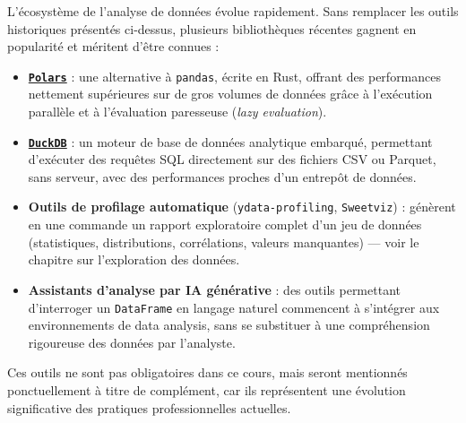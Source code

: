 \documentclass[
  french,
  letterpaper,
  open=any]{scrbook}
\providecommand{\tightlist}{%
  \setlength{\itemsep}{0pt}\setlength{\parskip}{0pt}}
\theoremstyle{definition}
\theoremstyle{definition}
\theoremstyle{remark}
\begin{document}
\begin{tcolorbox}[enhanced jigsaw, arc=.35mm, bottomrule=.15mm, bottomtitle=1mm, breakable, colback=white, colbacktitle=quarto-callout-important-color!10!white, colframe=quarto-callout-important-color-frame, coltitle=black, left=2mm, leftrule=.75mm, opacityback=0, opacitybacktitle=0.6, rightrule=.15mm, title=\textcolor{quarto-callout-important-color}{\faExclamation}\hspace{0.5em}{Zoom sur les tendances actuelles}, titlerule=0mm, toprule=.15mm, toptitle=1mm]

L'écosystème de l'analyse de données évolue rapidement. Sans remplacer
les outils historiques présentés ci-dessus, plusieurs bibliothèques
récentes gagnent en popularité et méritent d'être connues :

\begin{itemize}
\tightlist
\item
  \textbf{\href{https://pola.rs}{\texttt{Polars}}} : une alternative à
  \texttt{pandas}, écrite en Rust, offrant des performances nettement
  supérieures sur de gros volumes de données grâce à l'exécution
  parallèle et à l'évaluation paresseuse (\emph{lazy evaluation}).
\item
  \textbf{\href{https://duckdb.org}{\texttt{DuckDB}}} : un moteur de
  base de données analytique embarqué, permettant d'exécuter des
  requêtes SQL directement sur des fichiers CSV ou Parquet, sans
  serveur, avec des performances proches d'un entrepôt de données.
\item
  \textbf{Outils de profilage automatique} (\texttt{ydata-profiling},
  \texttt{Sweetviz}) : génèrent en une commande un rapport exploratoire
  complet d'un jeu de données (statistiques, distributions,
  corrélations, valeurs manquantes) --- voir le chapitre sur
  l'exploration des données.
\item
  \textbf{Assistants d'analyse par IA générative} : des outils
  permettant d'interroger un \texttt{DataFrame} en langage naturel
  commencent à s'intégrer aux environnements de data analysis, sans se
  substituer à une compréhension rigoureuse des données par l'analyste.
\end{itemize}

Ces outils ne sont pas obligatoires dans ce cours, mais seront
mentionnés ponctuellement à titre de complément, car ils représentent
une évolution significative des pratiques professionnelles actuelles.

\end{tcolorbox}
\end{document}
